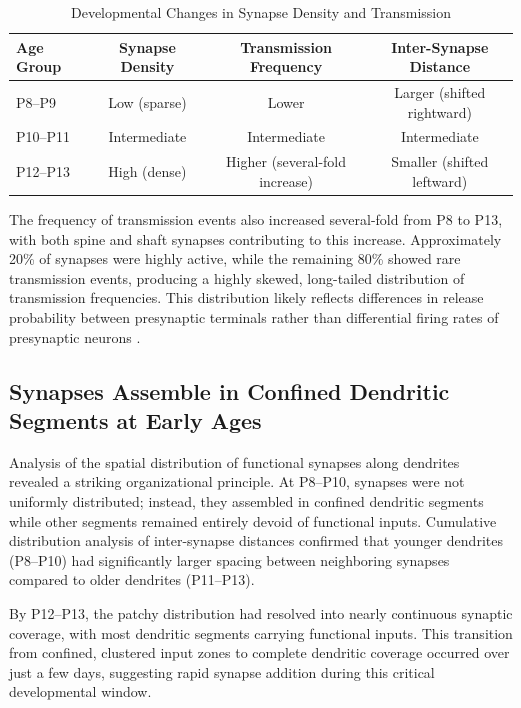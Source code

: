 \documentclass[11pt]{article}
\begin{document}
\begin{table}[ht]
\centering
\caption{Developmental Changes in Synapse Density and Transmission}
\label{tab:density}
\begin{tabular}{lccc}
\toprule
\textbf{Age Group} & \textbf{Synapse Density} & \textbf{Transmission Frequency} & \textbf{Inter-Synapse Distance} \\
\midrule
P8--P9 & Low (sparse) & Lower & Larger (shifted rightward) \\
P10--P11 & Intermediate & Intermediate & Intermediate \\
P12--P13 & High (dense) & Higher (several-fold increase) & Smaller (shifted leftward) \\
\bottomrule
\end{tabular}
\end{table}

The frequency of transmission events also increased several-fold from P8 to P13, with both spine and shaft synapses contributing to this increase. Approximately 20\% of synapses were highly active, while the remaining 80\% showed rare transmission events, producing a highly skewed, long-tailed distribution of transmission frequencies. This distribution likely reflects differences in release probability between presynaptic terminals rather than differential firing rates of presynaptic neurons \citep{katz1966release}.

\subsection{Synapses Assemble in Confined Dendritic Segments at Early Ages}

Analysis of the spatial distribution of functional synapses along dendrites revealed a striking organizational principle. At P8--P10, synapses were not uniformly distributed; instead, they assembled in confined dendritic segments while other segments remained entirely devoid of functional inputs. Cumulative distribution analysis of inter-synapse distances confirmed that younger dendrites (P8--P10) had significantly larger spacing between neighboring synapses compared to older dendrites (P11--P13).

By P12--P13, the patchy distribution had resolved into nearly continuous synaptic coverage, with most dendritic segments carrying functional inputs. This transition from confined, clustered input zones to complete dendritic coverage occurred over just a few days, suggesting rapid synapse addition during this critical developmental window.
\end{document}
